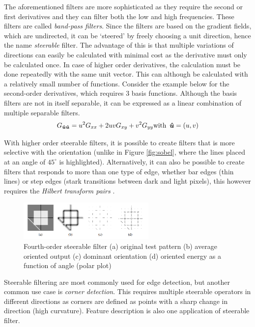 \documentclass[twoside,a4paper,article]{combine}
\begin{document}
The aforementioned filters are more sophisticated as they require the second or first derivatives and they can filter both the low and high frequencies. 
These filters are called \emph{band-pass filters}.
Since the filters are based on the gradient fields, which are undirected, it can be `steered' by freely choosing a unit direction, hence the name
\emph{steerable} filter. The advantage of this is that multiple variations of directions can easily be calculated with minimal cost as the derivative must only be calculated once. In case of higher order derivatives,
the calculation must be done repeatedly with the same unit vector. This can although be calculated with a relatively small number of functions\cite{Szeliski_2022}. Consider the example below for the second-order derivatives,
which requires 3 basis functions. Although the basis filters are not in itself separable, it can be expressed as a linear combination of multiple separable filters.
\[
    G_{\boldsymbol{\hat{u}}\boldsymbol{\hat{u}}} = u^2 G_{xx} + 2uvG_{xy} + v^2 G_{yy} \text{with} \hspace*{0.5em}\boldsymbol{\hat{u}} = (u, v)
\]

With higher order steerable filters, it is possible to create filters that is more selective with the orientation (unlike in Figure \ref{fig:sobel}, where the lines placed at an angle of $45^\circ$ is highlighted). Alternatively,
it can also be possible to create filters that responds to more than one type of edge, whether bar edges (thin lines) or step edges (stark transitions between dark and light pixels), this however requires the \emph{Hilbert transform pairs}
\cite{Szeliski_2022}.

\begin{minipage}{\textwidth}\begin{figure}[H]
    \captionsetup{justification=centering}
    \centering\includegraphics[width=0.60\textwidth]{img/higher.PNG}
    \caption{Fourth-order steerable filter (a) original test pattern (b) average oriented output (c) dominant orientation (d) oriented energy as a function of angle (polar plot)\cite{Szeliski_2022}}
\end{figure}\end{minipage}

Steerable filtering are most commonly used for edge detection, but another common use case is \emph{corner detection}. This requires multiple steerable operators in different directions as corners are defined as
points with a sharp change in direction (high curvature)\cite{NIXON2020141}. Feature description is also one application of steerable filter\cite{Szeliski_2022}.
\end{document}
